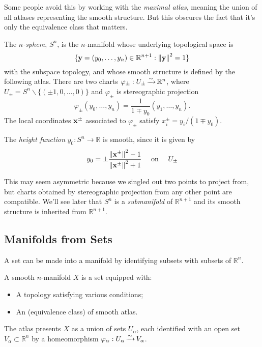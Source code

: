 \documentclass[a4paper,11pt]{article}
\begin{document}
	Some people avoid this by working with the \emph{maximal atlas}, meaning the union of all atlases representing the smooth structure. But this obscures the fact that it's only the equivalence class that matters.

	\begin{ex}
		The \emph{$n$-sphere}, $S^n$, is the $n$-manifold whose underlying topological space is
		\[
			\{\vb{y} = (y_0, \dots, y_n) \in \mathbb{R}^{n+1}: \norm{\vb{y}}^2 = 1\}
		\]
		with the subspace topology, and whose smooth structure is defined by the following atlas. There are two charts $\varphi_{\pm}: U_{\pm} \operatorname{\xrightarrow{\sim}} \mathbb{R}^n$, where $U_\pm = S^n \backslash \{(\pm 1, 0, \dots, 0)\}$ and $\varphi_{\pm}$ is stereographic projection
		\[
			\varphi_{\pm}(y_0, \dots, y_n) = \frac{1}{1 \mp y_0}(y_1, \dots, y_n).
		\]
		The local coordinates $\vb{x}^\pm$ associated to $\varphi_\pm$ satisfy $x^\pm_i = y_i / (1 \mp y_0)$.

		The \emph{height function} $y_0 : S^n \to \mathbb{R}$ is smooth, since it is given by
		\[
			y_0 = \pm \frac{\norm{\vb{x}^\pm}^2 - 1}{\norm{\vb{x}^\pm}^2 + 1}\quad\text{ on }\quad U_\pm
		\]
	\end{ex}

	\begin{rmk}
		This may seem asymmetric because we singled out two points to project from, but charts obtained by stereographic projection from any other point are compatible. We'll see later that $S^n$ is a \emph{submanifold} of $\mathbb{R}^{n+1}$ and its smooth structure is inherited from $\mathbb{R}^{n+1}$. 
	\end{rmk}

	\subsection{Manifolds from Sets} 

	A set can be made into a manifold by identifying subsets with subsets of $\mathbb{R}^n$.

	A smooth $n$-manifold $X$ is a set equipped with:
	\begin{itemize}
		\item A topology satisfying various conditions;
		\item An (equivalence class) of smooth atlas.
	\end{itemize}

	The atlas presents $X$ as a union of sets $U_\alpha$, each identified with an open set $V_\alpha \subset \mathbb{R}^n$ by a homeomorphism $\varphi_\alpha: U_\alpha \operatorname{\xrightarrow{\sim}} V_\alpha$.
\end{document}
